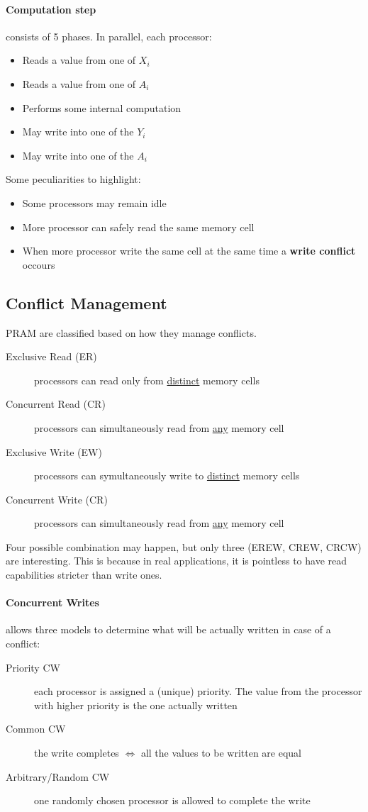 \documentclass{article}
\begin{document}
\paragraph{Computation step} consists of 5 phases. In parallel, each processor:
\begin{itemize}
\item Reads a value from one of $X_i$
\item Reads a value from one of $A_i$
\item Performs some internal computation
\item May write into one of the $Y_i$
\item May write into one of the $A_i$
\end{itemize}
Some peculiarities to highlight:
\begin{itemize}
\item Some processors may remain idle
\item More processor can safely read the same memory cell
\item When more processor write the same cell at the same time a \textbf{write conflict} occours
\end{itemize}

\subsection{Conflict Management} PRAM are classified based on how they manage conflicts. 
\begin{description}
\item[Exclusive Read (ER)] processors can read only from \underline{distinct} memory cells
\item[Concurrent Read (CR)] processors can simultaneously read from \underline{any} memory cell
\item[Exclusive Write (EW)] processors can symultaneously write to \underline{distinct} memory cells
\item[Concurrent Write (CR)] processors can simultaneously read from \underline{any} memory cell
\end{description}
Four possible combination may happen, but only three (EREW, CREW, CRCW) are interesting. This is because in  real applications, it is pointless to have read capabilities stricter than write ones.
\paragraph{Concurrent Writes} allows three models to determine what will be actually written in case of a conflict:
\begin{description}
\item[Priority CW] each processor is assigned a (unique) priority. The value from the processor with higher priority  is the one actually written
\item[Common CW] the write completes $\iff$ all the values to be written are equal
\item[Arbitrary/Random CW] one randomly chosen processor is allowed to complete the write
\end{description}
\end{document}
